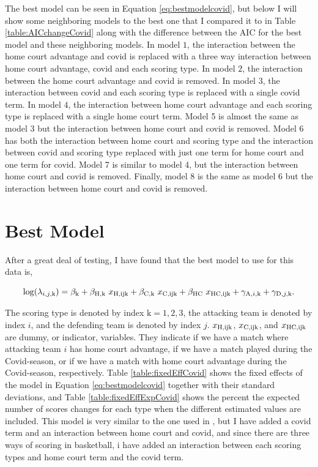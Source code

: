 \noindent The best model can be seen in Equation \ref{eq:bestmodelcovid}, but below I will show some neighboring models to the best one that I compared it to in Table \ref{table:AICchangeCovid} along with the difference between the AIC for the best model and these neighboring models. In model $1$, the interaction between the home court advantage and covid is replaced with a three way interaction between home court advantage, covid and each scoring type. In model $2$, the interaction between the home court advantage and covid is removed. In model $3$, the interaction between covid and each scoring type is replaced with a single covid term. In model $4$, the interaction between home court advantage and each scoring type is replaced with a single home court term. Model 5 is almost the same as model 3 but the interaction between home court and covid is removed. Model 6 has both the interaction between home court and scoring type and the interaction between covid and scoring type replaced with just one term for home court and one term for covid. Model 7 is similar to model 4, but the interaction between home court and covid is removed. Finally, model 8 is the same as model 6 but the interaction between home court and covid is removed.

\section{Best Model} \label{bestmod}

\noindent After a great deal of testing, I have found that the best model to use for this data is,

\begin{equation}
    \log(\lambda_{i,j,\text{k}}) = \beta_\text{k} + \beta_{\text{H},\text{k}} \ x_\text{H,ij\text{k}} + \beta_{\text{C},\text{k}} \ x_\text{C,ij\text{k}} + \beta_\text{HC} \ x_\text{HC,ij\text{k}} + \gamma_{\text{A},i,\text{k}} + \gamma_{\text{D},j,\text{k}}.
\label{eq:bestmodelcovid}
\end{equation}

\noindent The scoring type is denoted by index $\text{k} = 1,2,3$, the attacking team is denoted by index $i$, and the defending team is denoted by index $j$. $x_\text{H,ij\text{k}}$, $x_\text{C,ij\text{k}}$, and $x_\text{HC,ij\text{k}}$ are dummy, or indicator, variables. They indicate if we have a match where attacking team $i$ has home court advantage, if we have a match played during the Covid-season, or if we have a match with home court advantage during the Covid-season, respectively. Table \ref{table:fixedEffCovid} shows the fixed effects of the model in Equation \ref{eq:bestmodelcovid} together with their standard deviations, and Table \ref{table:fixedEffExpCovid} shows the percent the expected number of scores changes for each type when the different estimated values are included. This model is very similar to the one used in \cite{fotballglmm}, but I have added a covid term and an interaction between home court and covid, and since there are three ways of scoring in basketball, i have added an interaction between each scoring types and home court term and the covid term.

